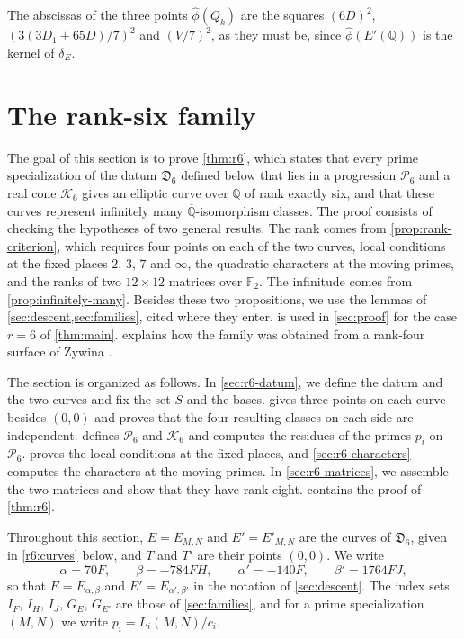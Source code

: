 \documentclass[12pt,oneside,openany]{book}
\theoremstyle{definition}
\theoremstyle{plain}
\numberwithin{equation}{chapter}
\theoremstyle{plain}
\theoremstyle{definition}
\theoremstyle{remark}
\newcommand{\Q}{\mathbb Q}
\newcommand{\F}{\mathbb F}
\newcommand{\Qbar}{\overline{\mathbb Q}}
\newcommand{\dual}{\hat\phi}
\newcommand{\datum}{\mathfrak D}
\newcommand{\cP}{\mathcal P}
\newcommand{\cK}{\mathcal K}
\begin{document}
The abscissas of the three points $\dual(Q_k)$ are the squares $(6D)^2$, $(3(3D_1+65D)/7)^2$ and $(V/7)^2$, as they must be, since $\dual(E'(\Q))$ is the kernel of $\delta_E$.
\chapter{The rank-six family}\label{sec:rank6}

The goal of this section is to prove \cref{thm:r6}, which states that every prime specialization of the datum $\datum_6$ defined below that lies in a progression $\cP_6$ and a real cone $\cK_6$ gives an elliptic curve over $\Q$ of rank exactly six, and that these curves represent infinitely many $\Qbar$-isomorphism classes. The proof consists of checking the hypotheses of two general results. The rank comes from \cref{prop:rank-criterion}, which requires four points on each of the two curves, local conditions at the fixed places $2$, $3$, $7$ and $\infty$, the quadratic characters at the moving primes, and the ranks of two $12\times12$ matrices over $\F_2$. The infinitude comes from \cref{prop:infinitely-many}. Besides these two propositions, we use the lemmas of \cref{sec:descent,sec:families}, cited where they enter.  is used in \cref{sec:proof} for the case $r=6$ of \cref{thm:main}.  explains how the family was obtained from a rank-four surface of Zywina \cite[\S6.5]{Zywina2026}.

The section is organized as follows. In \cref{sec:r6-datum}, we define the datum and the two curves and fix the set $S$ and the bases.  gives three points on each curve besides $(0,0)$ and proves that the four resulting classes on each side are independent.  defines $\cP_6$ and $\cK_6$ and computes the residues of the primes $p_i$ on $\cP_6$.  proves the local conditions at the fixed places, and \cref{sec:r6-characters} computes the characters at the moving primes. In \cref{sec:r6-matrices}, we assemble the two matrices and show that they have rank eight.  contains the proof of \cref{thm:r6}.

Throughout this section, $E=E_{M,N}$ and $E'=E'_{M,N}$ are the curves of $\datum_6$, given in \eqref{r6:curves} below, and $T$ and $T'$ are their points $(0,0)$. We write
\[
\alpha=70F,\qquad \beta=-784FH,\qquad \alpha'=-140F,\qquad \beta'=1764FJ,
\]
so that $E=E_{\alpha,\beta}$ and $E'=E_{\alpha',\beta'}$ in the notation of \cref{sec:descent}. The index sets $I_F$, $I_H$, $I_J$, $G_E$, $G_{E'}$ are those of \cref{sec:families}, and for a prime specialization $(M,N)$ we write $p_i=L_i(M,N)/c_i$.
\end{document}
